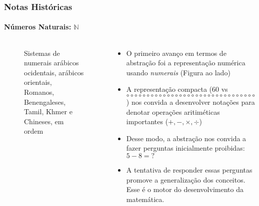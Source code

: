\documentclass[usenames,dvipsnames,svgnames]{beamer}
\begin{document}
\begin{frame}
	
	\frametitle{Notas Históricas}
	\framesubtitle{Números Naturais: $\mathbb{N}$}

	\begin{columns}[t]
	\begin{column}{.3\textwidth}
		\begin{figure}
			\caption{\small Sistemas de numerais arábicos ocidentais, arábicos orientais, Romanos, Benengaleses, Tamil, Khmer e Chineses, em ordem}
		\end{figure}
	\end{column}
	\begin{column}{.7\textwidth}
		\begin{itemize}
		\item O primeiro avanço em termos de {\color{red}abstração} foi a representação numérica usando \emph{numerais} (Figura ao lado)
		\item A representação compacta ($60$ vs \tiny$\circ \circ \circ \circ \circ \circ \circ \circ \circ \circ \circ \circ \circ \circ \circ \circ \circ \circ \circ \circ \circ \circ \circ \circ \circ \circ \circ \circ \circ \circ \circ \circ \circ \circ \circ \circ \circ \circ \circ \circ \circ \circ$\normalsize) nos convida a desenvolver {\color{red}notações} para denotar operações aritiméticas importantes ($+, -, \times, \div$)
		\item Desse modo, a abstração nos convida a fazer perguntas inicialmente proibidas: $5 - 8 = ?$
		\item A tentativa de responder essas perguntas promove a {\color{red}generalização} dos conceitos. Esse é o motor do desenvolvimento da matemática.
		\end{itemize}
	\end{column}
	\end{columns}	

\end{frame}
\end{document}
